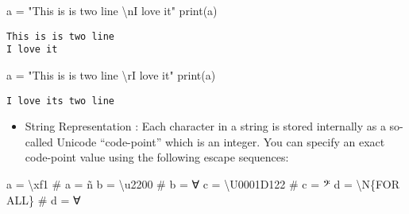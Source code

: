 \documentclass[
  letterpaper,
  DIV=11,
  numbers=noendperiod]{scrreprt}
\newenvironment{Shaded}{\begin{snugshade}}{\end{snugshade}}
\newcommand{\BuiltInTok}[1]{\textcolor[rgb]{0.00,0.46,0.62}{#1}}
\newcommand{\BuiltInTok}[1]{\textcolor[rgb]{0.00,0.48,0.65}{#1}}
\newcommand{\CharTok}[1]{\textcolor[rgb]{0.13,0.47,0.30}{#1}}
\newcommand{\CommentTok}[1]{\textcolor[rgb]{0.37,0.37,0.37}{#1}}
\newcommand{\NormalTok}[1]{\textcolor[rgb]{0.00,0.46,0.62}{#1}}
\newcommand{\OperatorTok}[1]{\textcolor[rgb]{0.37,0.37,0.37}{#1}}
\newcommand{\NormalTok}[1]{\textcolor[rgb]{0.00,0.48,0.65}{#1}}
\newcommand{\OperatorTok}[1]{\textcolor[rgb]{0.37,0.37,0.37}{#1}}
\newcommand{\StringTok}[1]{\textcolor[rgb]{0.13,0.47,0.30}{#1}}
\providecommand{\tightlist}{%
  \setlength{\itemsep}{0pt}\setlength{\parskip}{0pt}}
\begin{document}
\begin{Shaded}
\begin{Highlighting}[]
\begin{Shaded}
\begin{Highlighting}[]
\NormalTok{a  }\OperatorTok{=} \StringTok{"This is is two line }\CharTok{\textbackslash{}n}\StringTok{I love it"}
\BuiltInTok{print}\NormalTok{(a)}
\end{Highlighting}
\end{Shaded}

\begin{verbatim}
This is is two line 
I love it
\end{verbatim}

\begin{Shaded}
\begin{Highlighting}[]
\NormalTok{a  }\OperatorTok{=} \StringTok{"This is is two line }\CharTok{\textbackslash{}r}\StringTok{I love it"}
\BuiltInTok{print}\NormalTok{(a)}
\end{Highlighting}
\end{Shaded}

\begin{verbatim}
I love its two line 
\end{verbatim}

\begin{itemize}
\tightlist
\item
  String Representation : Each character in a string is stored
  internally as a so-called Unicode ``code-point'' which is an integer.
  You can specify an exact code-point value using the following escape
  sequences:
\end{itemize}

\begin{Shaded}
\begin{Highlighting}[]
\NormalTok{a }\OperatorTok{=} \StringTok{\textquotesingle{}}\CharTok{\textbackslash{}xf1}\StringTok{\textquotesingle{}}          \CommentTok{\# a = \textquotesingle{}ñ\textquotesingle{}}
\NormalTok{b }\OperatorTok{=} \StringTok{\textquotesingle{}}\CharTok{\textbackslash{}u2200}\StringTok{\textquotesingle{}}        \CommentTok{\# b = \textquotesingle{}∀\textquotesingle{}}
\NormalTok{c }\OperatorTok{=} \StringTok{\textquotesingle{}}\CharTok{\textbackslash{}U0001D122}\StringTok{\textquotesingle{}}    \CommentTok{\# c = \textquotesingle{}𝄢\textquotesingle{}}
\NormalTok{d }\OperatorTok{=} \StringTok{\textquotesingle{}}\CharTok{\textbackslash{}N\{FOR ALL\}}\StringTok{\textquotesingle{}}   \CommentTok{\# d = \textquotesingle{}∀\textquotesingle{}}
\end{Highlighting}
\end{Shaded}


\end{Highlighting}
\end{Shaded}
\end{document}
